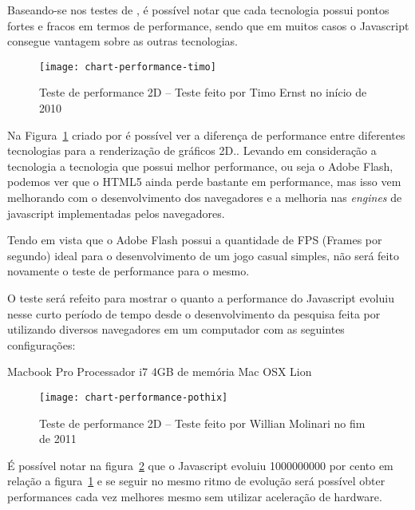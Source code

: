 Baseando-se nos testes de , é possível notar que
cada tecnologia possui pontos fortes e fracos em termos de performance, sendo que
em muitos casos o Javascript consegue vantagem sobre as outras tecnologias.

\begin{figure}[H]
  \centering
	\texttt{[image: chart-performance-timo]}
  \caption{Teste de performance 2D {--} Teste feito por Timo Ernst no
  início de 2010}
  \label{img:chart-performance-timo}
\end{figure}

Na Figura~\ref{img:chart-performance-timo} criado por  é
possível ver a diferença de performance entre diferentes tecnologias para a
renderização de gráficos 2D..
Levando em consideração a tecnologia a tecnologia que possui melhor performance,
ou seja o Adobe Flash, podemos ver que o HTML5 ainda perde bastante em performance,
mas isso vem melhorando com o desenvolvimento dos navegadores e a melhoria nas
\textit{engines} de javascript implementadas pelos navegadores.

Tendo em vista que o Adobe Flash possui a quantidade de FPS (Frames por segundo) ideal
para o desenvolvimento de um jogo casual simples, não será feito novamente o teste de
performance para o mesmo.

O teste será refeito para mostrar o quanto a performance do Javascript evoluiu nesse curto
período de tempo desde o desenvolvimento da pesquisa feita por 
utilizando diversos navegadores em um computador com as seguintes configurações:

Macbook Pro
Processador i7
4GB de memória
Mac OSX Lion

\begin{figure}[H]
  \centering
	\texttt{[image: chart-performance-pothix]}
  \caption{Teste de performance 2D {--} Teste feito por Willian
  Molinari no fim de 2011}
  \label{img:chart-performance-pothix}
\end{figure}

É possível notar na figura~\ref{img:chart-performance-pothix} que o Javascript evoluiu 1000000000 por cento
em relação a figura~\ref{img:chart-performance-timo} e se seguir no mesmo ritmo de evolução
será possível obter performances cada vez melhores mesmo sem utilizar aceleração de
hardware.

